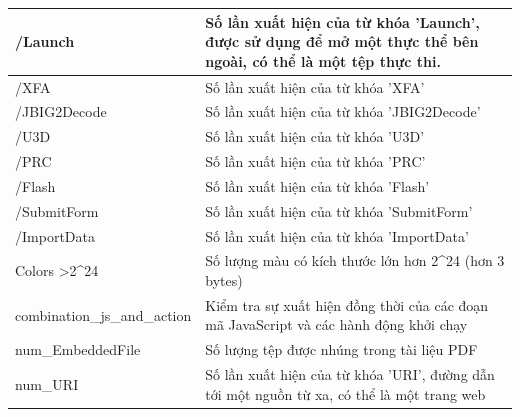 \documentclass[./../main.tex]{subfiles}
\begin{document}
\begin{longtable}[c]{|p{}|p{}|}
	/Launch                                   & Số lần xuất hiện của từ khóa 'Launch', được sử dụng để mở một thực thể bên ngoài, có thể là một tệp thực thi.               \\ \hline
	/XFA                                      & Số lần xuất hiện của từ khóa 'XFA'                                                                                          \\ \hline
	/JBIG2Decode                              & Số lần xuất hiện của từ khóa 'JBIG2Decode'                                                                                  \\ \hline
	/U3D                                      & Số lần xuất hiện của từ khóa 'U3D'                                                                                          \\ \hline
	/PRC                                      & Số lần xuất hiện của từ khóa 'PRC'                                                                                          \\ \hline
	/Flash                                    & Số lần xuất hiện của từ khóa 'Flash'                                                                                        \\ \hline
	/SubmitForm                               & Số lần xuất hiện của từ khóa 'SubmitForm'                                                                                   \\ \hline
	/ImportData                               & Số lần xuất hiện của từ khóa 'ImportData'                                                                                   \\ \hline
	Colors \textgreater 2\textasciicircum{}24 & Số lượng màu có kích thước lớn hơn 2\textasciicircum{}24 (hơn 3 bytes)                                                      \\ \hline
	combination\_js\_and\_action              & Kiểm tra sự xuất hiện đồng thời của các đoạn mã JavaScript và các hành động khởi chạy                                       \\ \hline
	num\_EmbeddedFile                         & Số lượng tệp được nhúng trong tài liệu PDF                                                                                  \\ \hline
	num\_URI                                  & Số lần xuất hiện của từ khóa 'URI', đường dẫn tới một nguồn từ xa, có thể là một trang web                                  \\ \hline

\end{longtable}
\end{document}
